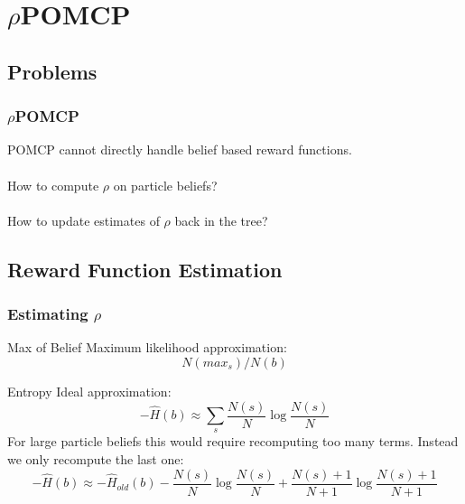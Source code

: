 \documentclass[xcolor={dvipsnames}]{beamer}
\begin{document}
\section{$\rho$POMCP}
\subsection{Problems}
\begin{frame}
\frametitle{$\rho$POMCP}
\begin{block}{}
POMCP cannot directly handle belief based reward functions. \\~\\
How to compute $\rho$ on particle beliefs? \\~\\
How to update estimates of $\rho$ back in the tree?
\end{block}
\end{frame}

\subsection{Reward Function Estimation}
\begin{frame}
\frametitle{Estimating $\rho$}
\begin{block}{Max of Belief}
Maximum likelihood approximation:
\begin{equation}
N(max_s)/N(b) \nonumber
\end{equation}
\end{block}

\begin{block}{Entropy}
Ideal approximation:
\begin{equation}
-\hat{H}(b) \approx \sum_s \frac{N(s)}{N} \log \frac{N(s)}{N} \nonumber
\end{equation}
For large particle beliefs this would require recomputing too many terms.
Instead we only recompute the last one:
\begin{equation}
-\hat{H}(b) \approx -\hat{H}_{old}(b) - \frac{N(s)}{N} \log \frac{N(s)}{N} + \frac{N(s)+1}{N+1} \log \frac{N(s)+1}{N+1}  \nonumber
\end{equation}
\end{block}
\end{frame}
\end{document}
